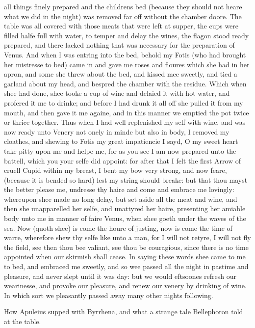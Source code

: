 all things finely prepared and the childrens bed (because they should not heare
what we did in the night) was removed far off without the chamber doore. The
table was all covered with those meats that were left at supper, the cups were
filled halfe full with water, to temper and delay the wines, the flagon stood
ready prepared, and there lacked nothing that was necessary for the preparation
of Venus. And when I was entring into the bed, behold my Fotis (who had brought
her mistresse to bed) came in and gave me roses and floures which she had in
her apron, and some she threw about the bed, and kissed mee sweetly, and tied a
garland about my head, and bespred the chamber with the residue. Which when
shee had done, shee tooke a cup of wine and delaied it with hot water, and
profered it me to drinke; and before I had drunk it all off she pulled it from
my mouth, and then gave it me againe, and in this manner we emptied the pot
twice or thrice together. Thus when I had well replenished my self with wine,
and was now ready unto Venery not onely in minde but also in body, I removed my
cloathes, and shewing to Fotis my great impatiencie I sayd, O my sweet heart
take pitty upon me and helpe me, for as you see I am now prepared unto the
battell, which you your selfe did appoint: for after that I felt the first
Arrow of cruell Cupid within my breast, I bent my bow very strong, and now
feare, (because it is bended so hard) lest my string should breake: but that
thou mayst the better please me, undresse thy haire and come and embrace me
lovingly: whereupon shee made no long delay, but set aside all the meat and
wine, and then she unapparelled her selfe, and unattyred her haire, presenting
her amiable body unto me in manner of faire Venus, when shee goeth under the
waves of the sea. Now (quoth shee) is come the houre of justing, now is come
the time of warre, wherefore shew thy selfe like unto a man, for I will not
retyre, I will not fly the field, see then thou bee valiant, see thou be
couragious, since there is no time appointed when our skirmish shall cease. In
saying these words shee came to me to bed, and embraced me sweetly, and so wee
passed all the night in pastime and pleasure, and never slept until it was day:
but we would eftsoones refresh our wearinesse, and provoke our pleasure, and
renew our venery by drinking of wine. In which sort we pleasantly passed away
many other nights following.


How Apuleius supped with Byrrhena, and what a strange tale Bellephoron told at
the table.

